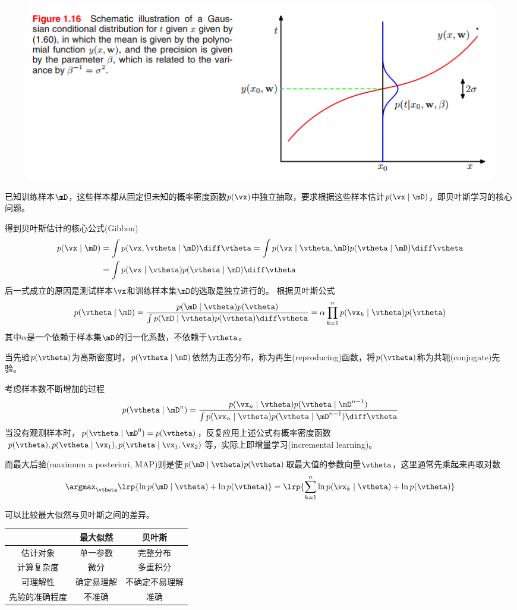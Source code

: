 \begin{figure}[H]
\centering
\includegraphics[width=0.8\linewidth]{fig/bayesian_est.png}
\end{figure}

已知训练样本$\mD$，这些样本都从固定但未知的概率密度函数$p(\vx)$中独立抽取，要求根据这些样本估计$p(\vx\mid\mD)$，即贝叶斯学习的核心问题。

得到贝叶斯估计的核心公式(Gibbon)
\[\begin{aligned}
p(\vx\mid\mD)&=\int p(\vx,\vtheta\mid\mD)\diff\vtheta
=\int p(\vx\mid\vtheta,\mD)p(\vtheta\mid\mD)\diff\vtheta\\
&=\int p(\vx\mid\vtheta)p(\vtheta\mid\mD)\diff\vtheta
\end{aligned}\]
后一式成立的原因是测试样本$\vx$和训练样本集$\mD$的选取是独立进行的。
根据贝叶斯公式
\[p(\vtheta\mid\mD)=\frac{p(\mD\mid\vtheta)p(\vtheta)}{\int p(\mD\mid\vtheta)p(\vtheta)\diff\vtheta}=\alpha\prod_{k=1}^np(\vx_k\mid\vtheta)p(\vtheta)\]
其中$\alpha$是一个依赖于样本集$\mD$的归一化系数，不依赖于$\vtheta$。

当先验$p(\vtheta)$为高斯密度时，$p(\vtheta\mid\mD)$依然为正态分布，称为再生(reproducing)函数，将$p(\vtheta)$称为共轭(conjugate)先验。

考虑样本数不断增加的过程
\[p(\vtheta\mid\mD^n)=\frac{p(\vx_n\mid\vtheta)p(\vtheta\mid\mD^{n-1})}{\int p(\vx_n\mid\vtheta)p(\vtheta\mid\mD^{n-1})\diff\vtheta}\]
当没有观测样本时，$p(\vtheta\mid\mD^0)=p(\vtheta)$，反复应用上述公式有概率密度函数$p(\vtheta),p(\vtheta\mid\vx_1),p(\vtheta\mid\vx_1,\vx_2)$等，实际上即增量学习(incremental learning)。

而最大后验(maximum a posteriori, MAP)则是使$p(\mD\mid\vtheta)p(\vtheta)$取最大值的参数向量$\vtheta$，这里通常先乘起来再取对数
\[\argmax_{\vtheta} \lrp{\ln p(\mD\mid\vtheta) + \ln p(\vtheta)}
=\lrp{\sum_{k=1}^n\ln p(\vx_k\mid\vtheta)+\ln p(\vtheta)}\]

可以比较最大似然与贝叶斯之间的差异。
\begin{center}
\begin{tabular}{|c|c|c|}\hline
 & 最大似然 & 贝叶斯\\\hline
估计对象 & 单一参数 & 完整分布\\\hline
计算复杂度 & 微分 & 多重积分\\\hline
可理解性 & 确定易理解 & 不确定不易理解\\\hline
先验的准确程度 & 不准确 & 准确\\\hline
\end{tabular}
\end{center}

